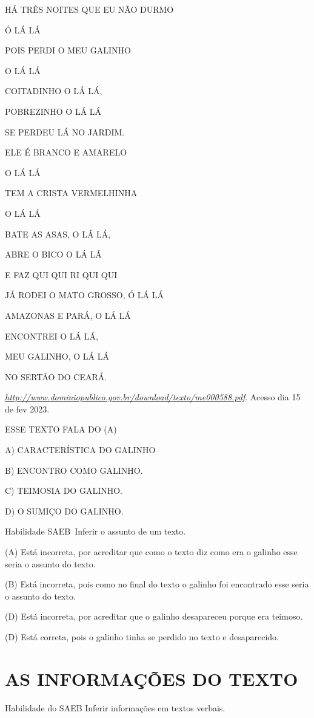\begin{escola}
HÁ TRÊS NOITES QUE EU NÃO DURMO

Ó LÁ LÁ

POIS PERDI O MEU GALINHO

O LÁ LÁ

COITADINHO O LÁ LÁ,

POBREZINHO O LÁ LÁ

SE PERDEU LÁ NO JARDIM.

ELE É BRANCO E AMARELO

O LÁ LÁ

TEM A CRISTA VERMELHINHA

O LÁ LÁ

BATE AS ASAS, O LÁ LÁ,

ABRE O BICO O LÁ LÁ

E FAZ QUI QUI RI QUI QUI

JÁ RODEI O MATO GROSSO, Ó LÁ LÁ

AMAZONAS E PARÁ, O LÁ LÁ

ENCONTREI O LÁ LÁ,

MEU GALINHO, O LÁ LÁ

NO SERTÃO DO CEARÁ.

\href{http://www.dominiopublico.gov.br/download/texto/me000588.pdf}{\emph{http://www.dominiopublico.gov.br/download/texto/me000588.pdf}}.
Acesso dia 15 de fev 2023.

ESSE TEXTO FALA DO (A)

A) CARACTERÍSTICA DO GALINHO

B) ENCONTRO COMO GALINHO.

C) TEIMOSIA DO GALINHO.

D) O SUMIÇO DO GALINHO.

Habilidade SAEB~Inferir o assunto de um texto.

(A) Está incorreta, por acreditar que como o texto diz como era o
galinho esse seria o assunto do texto.

(B) Está incorreta, pois como no final do texto o galinho foi encontrado
esse seria o assunto do texto.

(D) Está incorreta, por acreditar que o galinho desapareceu porque era
teimoso.

(D) Está correta, pois o galinho tinha se perdido no texto e
desaparecido.

\chapter{AS INFORMAÇÕES DO TEXTO}

\protect\hypertarget{_heading=h.1pxezwc}{}{}Habilidade do SAEB
Inferir informações em textos verbais.


\end{escola}
